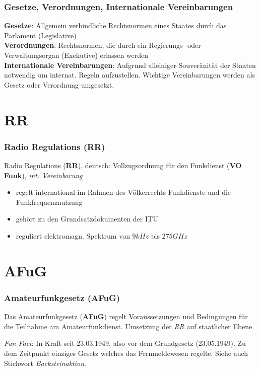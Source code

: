 \begin{frame}
    \frametitle{Gesetze, Verordnungen, Internationale Vereinbarungen}

    \textbf{Gesetze}: Allgemein verbindliche Rechtsnormen eines Staates durch
    das Parlament (Legislative) \\[1em]

    \textbf{Verordnungen}: Rechtsnormen, die durch ein Regierungs- oder
    Verwaltungsorgan (Exekutive) erlassen werden \\[1em]

    \textbf{Internationale Vereinbarungen}: Aufgrund alleiniger Souveränität der
    Staaten notwendig um internat. Regeln aufzustellen. Wichtige Vereinbarungen
    werden als Gesetz oder Verordnung umgesetzt.

\end{frame}


\section{RR}

\begin{frame}
    \frametitle{Radio Regulations (RR)}
    
    Radio Regulations (\textbf{RR}), deutsch: Vollzugsordnung für den Funkdienst
    (\textbf{VO Funk}), \emph{int. Vereinbarung}

    \begin{itemize}
        \item regelt international im Rahmen des Völkerrechts Funkdienste und
              die Funkfrequenznutzung
        \item gehört zu den Grundsatzdokumenten der ITU
        \item reguliert elektromagn. Spektrum von $9kHz$ bis $275GHz$
    \end{itemize}

\end{frame}

\section{AFuG}

\begin{frame}
    \frametitle{Amateurfunkgesetz (AFuG)}

    Das Amateurfunkgesetz (\textbf{AFuG}) regelt Voraussetzungen und Bedingungen
    für die Teilnahme am Amateurfunkdienst. Umsetzung der \emph{RR} auf
    staatlicher Ebene.

    \emph{Fun Fact}: In Kraft seit 23.03.1949, also vor dem Grundgesetz
    (23.05.1949). Zu dem Zeitpunkt einziges Gesetz welches das Fernmeldewesen
    regelte. Siehe auch Stichwort \emph{Backsteinaktion}.

\end{frame}

